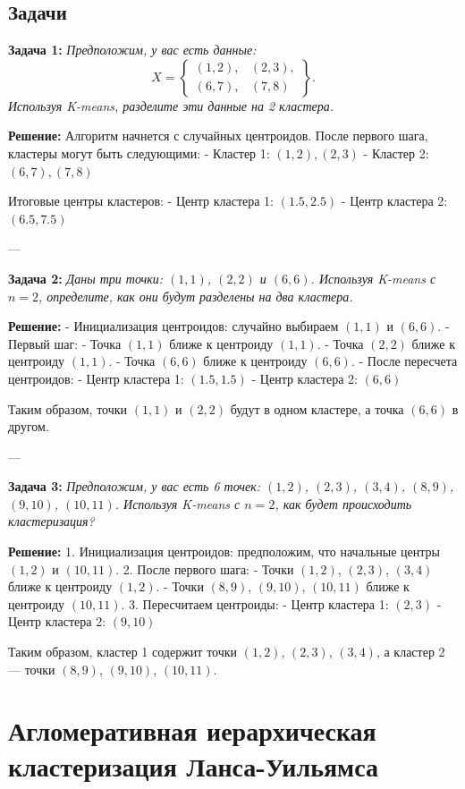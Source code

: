 \subsection*{Задачи}

\textbf{Задача 1:} \textit{Предположим, у вас есть данные:}
\[
    X = \left\{
    \begin{array}{cc}
        (1, 2), & (2, 3), \\
        (6, 7), & (7, 8)
    \end{array}
    \right\}.
\]
\textit{Используя K-means, разделите эти данные на 2 кластера.}

\textbf{Решение:}
Алгоритм начнется с случайных центроидов. После первого шага, кластеры могут быть следующими:
- Кластер 1: $(1, 2), (2, 3)$
- Кластер 2: $(6, 7), (7, 8)$

Итоговые центры кластеров:
- Центр кластера 1: $(1.5, 2.5)$
- Центр кластера 2: $(6.5, 7.5)$

---

\textbf{Задача 2:} \textit{Даны три точки: $(1, 1)$, $(2, 2)$ и $(6, 6)$. Используя K-means с $n=2$, определите, как они будут разделены на два кластера.}

\textbf{Решение:}
- Инициализация центроидов: случайно выбираем $(1, 1)$ и $(6, 6)$.
- Первый шаг:
- Точка $(1, 1)$ ближе к центроиду $(1, 1)$.
- Точка $(2, 2)$ ближе к центроиду $(1, 1)$.
- Точка $(6, 6)$ ближе к центроиду $(6, 6)$.
- После пересчета центроидов:
- Центр кластера 1: $(1.5, 1.5)$
- Центр кластера 2: $(6, 6)$

Таким образом, точки $(1, 1)$ и $(2, 2)$ будут в одном кластере, а точка $(6, 6)$ в другом.

---

\textbf{Задача 3:} \textit{Предположим, у вас есть 6 точек: $(1, 2)$, $(2, 3)$, $(3, 4)$, $(8, 9)$, $(9, 10)$, $(10, 11)$. Используя K-means с $n=2$, как будет происходить кластеризация?}

\textbf{Решение:}
1. Инициализация центроидов: предположим, что начальные центры $(1, 2)$ и $(10, 11)$.
2. После первого шага:
- Точки $(1, 2)$, $(2, 3)$, $(3, 4)$ ближе к центроиду $(1, 2)$.
- Точки $(8, 9)$, $(9, 10)$, $(10, 11)$ ближе к центроиду $(10, 11)$.
3. Пересчитаем центроиды:
- Центр кластера 1: $(2, 3)$
- Центр кластера 2: $(9, 10)$

Таким образом, кластер 1 содержит точки $(1, 2)$, $(2, 3)$, $(3, 4)$, а кластер 2 — точки $(8, 9)$, $(9, 10)$, $(10, 11)$.

\section{Агломеративная иерархическая кластеризация Ланса-Уильямса}


